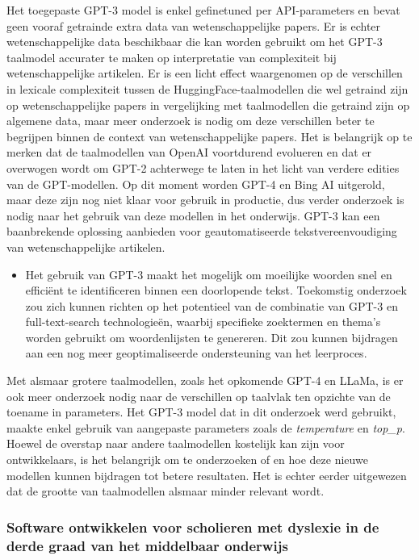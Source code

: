 \medspace

Het toegepaste GPT-3 model is enkel gefinetuned per API-parameters en bevat geen vooraf getrainde extra data van wetenschappelijke papers. Er is echter wetenschappelijke data beschikbaar die kan worden gebruikt om het GPT-3 taalmodel accurater te maken op interpretatie van complexiteit bij wetenschappelijke artikelen. Er is een licht effect waargenomen op de verschillen in lexicale complexiteit tussen de HuggingFace-taalmodellen die wel getraind zijn op wetenschappelijke papers in vergelijking met taalmodellen die getraind zijn op algemene data, maar meer onderzoek is nodig om deze verschillen beter te begrijpen binnen de context van wetenschappelijke papers. Het is belangrijk op te merken dat de taalmodellen van OpenAI voortdurend evolueren en dat er overwogen wordt om GPT-2 achterwege te laten in het licht van verdere edities van de GPT-modellen. Op dit moment worden GPT-4 en Bing AI uitgerold, maar deze zijn nog niet klaar voor gebruik in productie, dus verder onderzoek is nodig naar het gebruik van deze modellen in het onderwijs. GPT-3 kan een baanbrekende oplossing aanbieden voor geautomatiseerde tekstvereenvoudiging van wetenschappelijke artikelen.

\begin{itemize}
	\item Het gebruik van GPT-3 maakt het mogelijk om moeilijke woorden snel en efficiënt te identificeren binnen een doorlopende tekst. Toekomstig onderzoek zou zich kunnen richten op het potentieel van de combinatie van GPT-3 en full-text-search technologieën, waarbij specifieke zoektermen en thema's worden gebruikt om woordenlijsten te genereren. Dit zou kunnen bijdragen aan een nog meer geoptimaliseerde ondersteuning van het leerproces.
\end{itemize}

Met alsmaar grotere taalmodellen, zoals het opkomende GPT-4 en LLaMa, is er ook meer onderzoek nodig naar de verschillen op taalvlak ten opzichte van de toename in parameters. Het GPT-3 model dat in dit onderzoek werd gebruikt, maakte enkel gebruik van aangepaste parameters zoals de \textit{temperature} en \textit{top\_p}. Hoewel de overstap naar andere taalmodellen kostelijk kan zijn voor ontwikkelaars, is het belangrijk om te onderzoeken of en hoe deze nieuwe modellen kunnen bijdragen tot betere resultaten. Het is echter eerder uitgewezen dat de grootte van taalmodellen alsmaar minder relevant wordt. 


\subsubsection{Software ontwikkelen voor scholieren met dyslexie in de derde graad van het middelbaar onderwijs}

